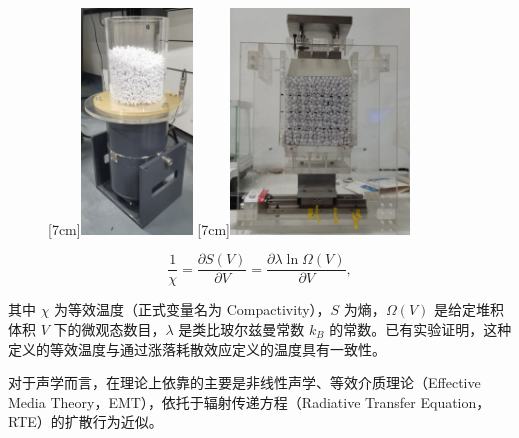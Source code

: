 \begin{figure}[!hbtp]
  \centering
                [7cm]{\includegraphics[height=6cm]{figures/1_tapping.jpg}}
  \hspace{1cm}
                [7cm]{\includegraphics[height=6cm]{figures/1_shearing.jpg}}
  \label{fig:apparatus_of_granular}
\end{figure}

\begin{equation}
  \frac{1}{\chi} = \frac{\partial S(V)}{\partial V} = \frac{\partial \lambda\ln{\Omega(V)}}{\partial V},
\end{equation}

其中 $\chi$ 为等效温度（正式变量名为 Compactivity），$S$ 为熵，$\Omega(V)$ 是给定堆积体积 $V$ 下的微观态数目，$\lambda$ 是类比玻尔兹曼常数 $k_{B}$ 的常数。已有实验证明，这种定义的等效温度与通过涨落耗散效应定义的温度具有一致性\cite{PhysRevLett.129.228004}。

对于声学而言，在理论上依靠的主要是非线性声学\cite{10.1029/93JB02974}、等效介质理论（Effective Media Theory，EMT）\cite{WALTON1987213}，依托于辐射传递方程（Radiative Transfer Equation，RTE）的扩散行为近似\cite{PhysRevLett.93.154303,PhysRevApplied.16.034009}。

